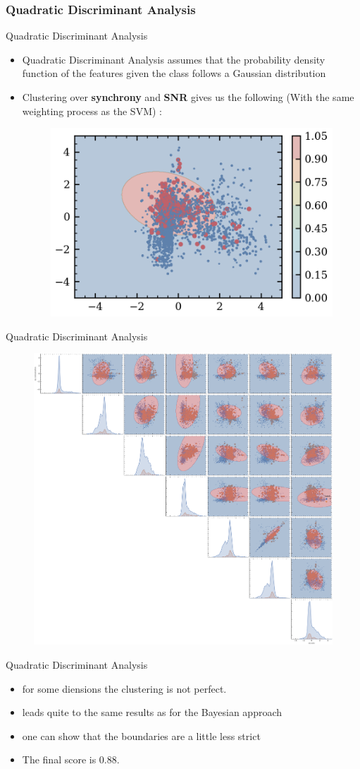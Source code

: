 \documentclass[numbering=fraction]{beamer}
\begin{document}
\subsubsection{Quadratic Discriminant Analysis}
\begin{frame}{Quadratic Discriminant Analysis}
    \begin{itemize}
        \item Quadratic Discriminant Analysis assumes that the probability density function of the features given the class follows a Gaussian distribution
        \item Clustering over \textbf{synchrony} and \textbf{SNR} gives us the following (With the same weighting process as the SVM) :
              \begin{figure}[H]
                  \centering
                  \includegraphics[width=0.6\linewidth]{figure/cluster_qda2.png}
              \end{figure}
    \end{itemize}
\end{frame}
\begin{frame}{Quadratic Discriminant Analysis}
    \begin{figure}[H]
        \centering
        \includegraphics[height=0.6\linewidth]{./figure/qda_pair.png}
    \end{figure}
\end{frame}
\begin{frame}{Quadratic Discriminant Analysis}
    \begin{itemize}
        \item for some diensions the clustering is not perfect.
        \item leads quite to the same results as for the Bayesian approach
        \item one can show that the boundaries are a little less strict
        \item The final score is 0.88.
    \end{itemize}
\end{frame}
\end{document}
